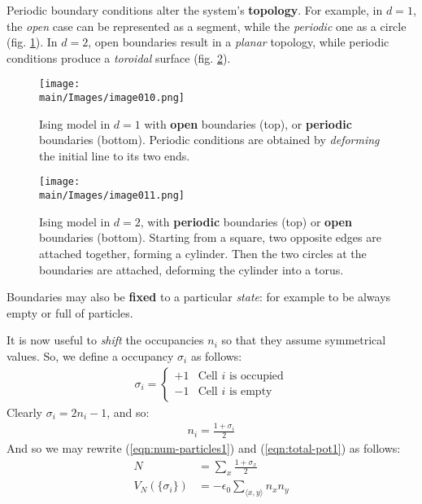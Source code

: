 \documentclass[../../main.tex]{subfiles}
\begin{document}
Periodic boundary conditions alter the system's \textbf{topology}. For example, in $d=1$, the \textit{open} case can be represented as a segment, while the \textit{periodic} one as a circle (fig. \ref{fig:1dperiodic}). In $d=2$, open boundaries result in a \textit{planar} topology, while periodic conditions produce a \textit{toroidal} surface (fig. \ref{fig:2dperiodic}).  

\begin{figure}[H]
    \centering
    \texttt{[image: \\main/Images/image010.png]}
    \caption{Ising model in $d=1$ with \textbf{open} boundaries (top), or \textbf{periodic} boundaries (bottom). Periodic conditions are obtained by \textit{deforming} the initial line to  its two ends.\label{fig:1dperiodic}}
\end{figure}

\begin{figure}[H]
    \centering
    \texttt{[image: \\main/Images/image011.png]}
    \caption{Ising model in $d=2$, with \textbf{periodic} boundaries (top) or \textbf{open} boundaries (bottom). Starting from a square, two opposite edges are attached together, forming a cylinder. Then the two circles at the boundaries are attached, deforming the cylinder into a torus.\label{fig:2dperiodic}}
\end{figure}

Boundaries may also be \textbf{fixed} to a particular \textit{state}: for example to be always empty or full of particles.

\medskip

It is now useful to \textit{shift} the occupancies $n_i$ so that they assume symmetrical values. So, we define a  occupancy $\sigma_i$ as follows:
\begin{align}\label{eqn:spins}
    \sigma_i = \begin{cases}
        +1 & \text{Cell $i$ is occupied}\\
        -1 & \text{Cell $i$ is empty}
    \end{cases}
\end{align}
Clearly $\sigma_i = 2n_i - 1$, and so:
\begin{align*}
    n_i = \frac{1 + \sigma_i}{2} 
\end{align*}
And so we may rewrite (\ref{eqn:num-particles1}) and (\ref{eqn:total-pot1}) as follows:
\begin{align} \label{eqn:num-particles}
    N &= \sum_x \frac{1 + \sigma_x}{2}\\ 
    \label{eqn:total-pot}
    V_N(\{\sigma_i\}) &= - \epsilon_0 \sum_{\langle x,y \rangle} n_x n_y
\end{align}
\end{document}
